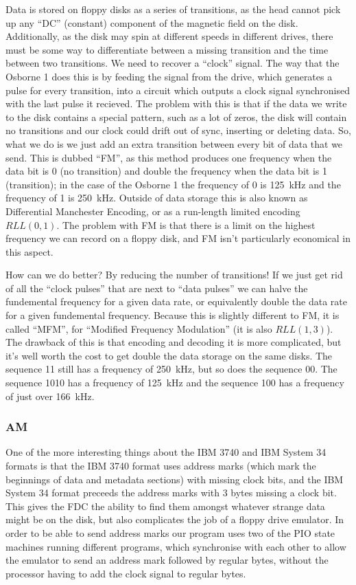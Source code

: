 \documentclass[a4paper]{article}
\begin{document}
Data is stored on floppy disks as a series of transitions, as the head
cannot pick up any ``DC'' (constant) component of the magnetic field
on the disk. Additionally, as the disk may spin at different speeds in
different drives, there must be some way to differentiate between a
missing transition and the time between two transitions. We need to
recover a ``clock'' signal. The way that the Osborne 1 does this is by
feeding the signal from the drive, which generates a pulse for every
transition, into a circuit which outputs a clock signal synchronised
with the last pulse it recieved. The problem with this is that if the
data we write to the disk contains a special pattern, such as a lot of
zeros, the disk will contain no transitions and our clock could drift
out of sync, inserting or deleting data. So, what we do is we just add
an extra transition between every bit of data that we send. This is
dubbed ``FM'', as this method produces one frequency when the data bit
is 0 (no transition) and double the frequency when the data bit is 1
(transition); in the case of the Osborne 1 the frequency of 0 is
\qty{125}{\kHz} and the frequency of 1 is \qty{250}{\kHz}. Outside of
data storage this is also known as Differential Manchester Encoding,
or as a run-length limited encoding \(RLL \left(0,1\right)\). The
problem with FM is that there is a limit on the highest frequency we
can record on a floppy disk, and FM isn't particularly economical in
this aspect.

How can we do better? By reducing the number of transitions! If we
just get rid of all the ``clock pulses'' that are next to ``data
pulses'' we can halve the fundemental frequency for a given data rate,
or equivalently double the data rate for a given fundemental
frequency. Because this is slightly different to FM, it is called ``MFM'', for
``Modified Frequency Modulation'' (it is also \(RLL \left(1,3\right)\)). The drawback of this is that
encoding and decoding it is more complicated, but it's well
worth the cost to get double the data storage on the same disks. The
sequence 11 still has a frequency of \qty{250}{\kHz}, but so
does the sequence 00. The sequence 1010 has a frequency of \qty{125}{\kHz} and the sequence
100 has a frequency of just over \qty{166}{\kHz}.

\subsubsection{AM}
\label{subsubsec:am}

One of the more interesting things about the IBM 3740 and IBM System 34 formats is that
the IBM 3740 format uses address marks (which mark the beginnings of data and metadata
sections) with missing clock bits, and the IBM System 34 format
preceeds the address marks with 3 bytes missing a clock bit. This gives the FDC
the ability to find them amongst whatever strange data might be on the
disk, but also complicates the job of a floppy drive emulator. In
order to be able to send address marks our program uses two of the PIO
state machines running different programs, which synchronise with each
other to allow the emulator to send an address mark followed by
regular bytes, without the processor having to add the clock signal to regular bytes.
\end{document}
